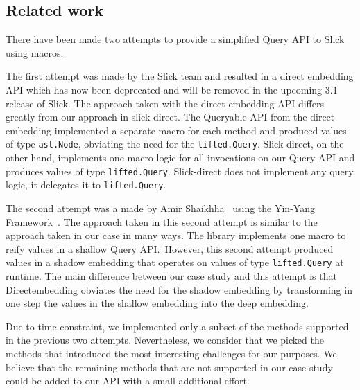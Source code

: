 \subsection{Related work} %
\label{sub:Relatedwork}
There have been made two attempts to provide a simplified Query API to Slick using macros.

\begin{sloppypar}
The first attempt was made by the Slick team and resulted in a direct embedding API which has now been deprecated and will be removed in the upcoming 3.1 release of Slick.
The approach taken with the direct embedding API differs greatly from our approach in slick-direct.
The Queryable API from the direct embedding implemented a separate macro for each method and produced values of type \texttt{ast.Node}, obviating the need for the \texttt{lifted.Query}.
Slick-direct, on the other hand, implements one macro logic for all invocations on our Query API and produces values of type \texttt{lifted.Query}.
Slick-direct does not implement any query logic, it delegates it to \texttt{lifted.Query}.
\end{sloppypar}

The second attempt was a made by Amir Shaikhha~\autocite{shaikhha_embedded_2014} using the Yin-Yang Framework~\autocite{jovanovic_yin-yang:_2014}.
The approach taken in this second attempt is similar to the approach taken in our case in many ways.
The library implements one macro to reify values in a shallow Query API.\
However, this second attempt produced values in a shadow embedding that operates on values of type \texttt{lifted.Query} at runtime.
The main difference between our case study and this attempt is that Directembedding obviates the need for the shadow embedding by transforming in one step the values in the shallow embedding into the deep embedding.

Due to time constraint, we implemented only a subset of the methods supported in the previous two attempts.
Nevertheless, we consider that we picked the methods that introduced the most interesting challenges for our purposes.
We believe that the remaining methods that are not supported in our case study could be added to our API with a small additional effort.





